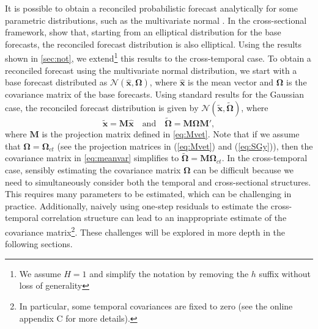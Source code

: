 \documentclass[a4paper,11pt]{article}
\newcommand{\xvet}{\bm{x}}
\newcommand{\Mvet}{\bm{M}}
\newcommand{\Omegavet}{\bm{\Omega}}
\theoremstyle{definition}
\begin{document}
It is possible to obtain a reconciled probabilistic forecast analytically for some parametric distributions, such as the multivariate normal \citep{corani2021, eckert2021, panagiotelis2023, wickramasuriya2021b}. In the cross-sectional framework, \cite{panagiotelis2023} show that, starting from an elliptical distribution for the base forecasts, the reconciled forecast distribution is also elliptical. Using the results shown in \autoref{sec:not}, we extend\footnote{We assume $H =1$ and simplify the notation by removing the $h$ suffix without loss of generality} this results to the cross-temporal case. To obtain a reconciled forecast using the multivariate normal distribution, we start with a base forecast distributed as $\mathcal{N}(\widehat{\xvet}, \Omegavet)$, where $\widehat{\xvet}$ is the mean vector and $\Omegavet$ is the covariance matrix of the base forecasts. Using standard results for the Gaussian case, the reconciled forecast distribution is given by $\mathcal{N}(\widetilde{\xvet}, \widetilde{\Omegavet})$, where
\begin{equation}\label{eq:meanvar}
	\widetilde{\xvet} = \Mvet\widehat{\xvet} \quad \mbox{and} \quad \widetilde{\Omegavet} = \Mvet \Omegavet \Mvet',
\end{equation}
where $\Mvet$ is the projection matrix defined in \eqref{eq:Mvet}.
Note that if we assume that $\Omegavet = \Omegavet_{ct}$ (see the projection matrices in (\ref{eq:Mvet}) and (\ref{eq:SGy})), then the covariance matrix in \eqref{eq:meanvar} simplifies to $\widetilde{\Omegavet} = \Mvet \Omegavet_{ct}$. In the cross-temporal case, sensibly estimating the covariance matrix $\Omegavet$ can be difficult because we need to simultaneously consider both the temporal and cross-sectional structures. This requires many parameters to be estimated, which can be challenging in practice. Additionally, naively using one-step residuals to estimate the cross-temporal correlation structure can lead to an inappropriate estimate of the covariance matrix\footnote{In particular, some temporal covariances are fixed to zero (see the online appendix C for more details).}. These challenges will be explored in more depth in the following sections.


\end{document}
